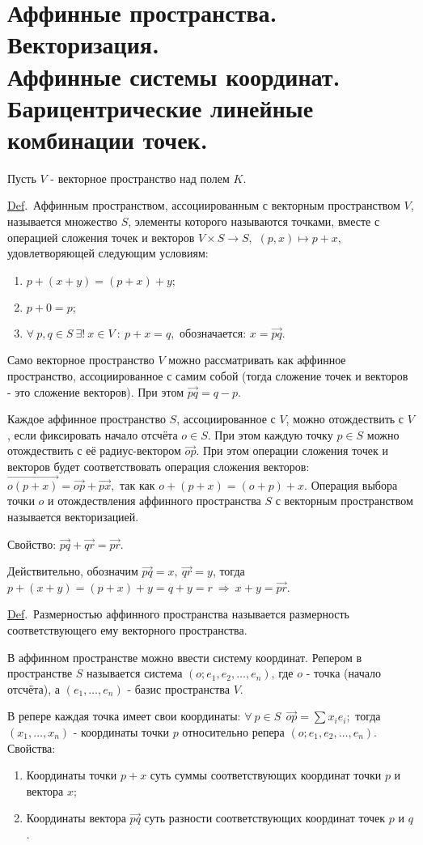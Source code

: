 \documentclass[a4paper]{article}%
\renewcommand{\de}{\par\noindent\underline{Def}.\ }%
\renewcommand{\ab}{\par\noindent}%
\newcommand{\baz}[1]{\left(#1_1,\dots,#1_n\right)}%
\renewcommand{\nn}[1]{#1_1,#1_2,\dots,#1_n}%
\newcommand{\oi}[1]{\overrightarrow{#1}}%
\begin{document}
\section{Аффинные пространства. Векторизация.\\ Аффинные системы координат.\\ Барицентрические линейные комбинации точек.}
\label{q36} %
Пусть $V$ - векторное пространство над полем $K$. %
\de Аффинным пространством, ассоциированным с векторным пространством $V$, называется множество $S$, элементы
которого называются точками, вместе с операцией сложения точек и векторов $V\times S\rightarrow S,$
$(p,x)\mapsto p+x$, удовлетворяющей следующим условиям:
\begin{enumerate}
    \item $p+(x+y)=(p+x)+y;$
    \item $p+0=p;$
    \item $\forall\ p,q\in S \ \exists !\ x\in V\ :\ p+x=q,$ обозначается: $x=\oi{pq}.$
\end{enumerate}
\ab Само векторное пространство $V$ можно рассматривать как аффинное пространство, ассоциированное с
самим собой
(тогда сложение точек и векторов - это сложение векторов). При этом $\oi{pq}=q-p.$ %
\ab Каждое аффинное пространство $S$, ассоциированное с $V$, можно отождествить с $V$, если фиксировать начало
отсчёта $o\in S.$ При этом каждую точку $p\in S$ можно отождествить с её радиус-вектором $\oi{op}.$ При этом
операции сложения точек и векторов будет соответствовать операция сложения векторов:
$\oi{o(p+x)}=\oi{op}+\oi{px},$ так как $o+(p+x)=(o+p)+x.$ Операция выбора
точки $o$ и отождествления аффинного пространства $S$ с векторным пространством называется векторизацией. %
\ab Свойство: $\oi{pq}+\oi{qr}=\oi{pr}.$  %
\ab Действительно, обозначим $\oi{pq}=x,\ \oi{qr}=y$, тогда $p+(x+y)=(p+x)+y=q+y=r\ \Rightarrow\ x+y=\oi{pr}$. %
\de Размерностью аффинного пространства называется размерность соответствующего ему векторного пространства.
\ab В аффинном пространстве можно ввести систему координат. Репером в пространстве $S$ называется система
$(o;\nn{e})$, где $o$ - точка (начало отсчёта), а $\baz{e}$ - базис пространства $V$. %
\ab В репере каждая точка имеет свои координаты: $\forall\ p\in S\ \ \oi{op}=\sum x_ie_i;$ тогда $\baz{x}$ -
координаты точки $p$ относительно репера $(o;\nn{e})$. Свойства:
\begin{enumerate}
    \item Координаты точки $p+x$ суть суммы соответствующих координат точки $p$ и вектора $x$;
    \item Координаты вектора $\oi{pq}$ суть разности соответствующих координат точек $p$ и $q$.
\end{enumerate}
\end{document}
